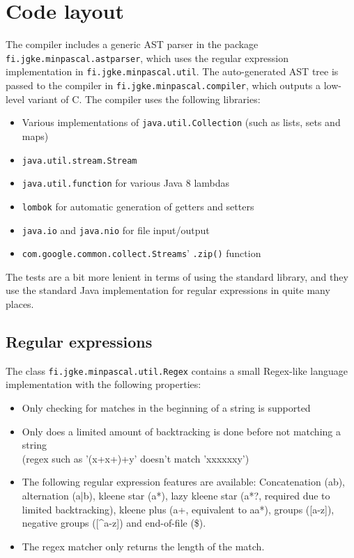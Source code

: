 \documentclass{article}
\begin{document}
\section{Code layout}
The compiler includes a generic AST parser in the package
\texttt{fi.jgke.minpascal.astparser}, which uses the regular expression
implementation in \texttt{fi.jgke.minpascal.util}. The auto-generated AST tree
is passed to the compiler in \texttt{fi.jgke.minpascal.compiler}, which outputs
a low-level variant of C. The compiler uses the following libraries:
\begin{itemize}
    \item Various implementations of \texttt{java.util.Collection} (such as lists, sets and maps)
    \item \texttt{java.util.stream.Stream}
    \item \texttt{java.util.function} for various Java 8 lambdas
    \item \texttt{lombok} for automatic generation of getters and setters
    \item \texttt{java.io} and \texttt{java.nio} for file input/output
    \item \texttt{com.google.common.collect.Streams}' \texttt{.zip()} function
\end{itemize}

The tests are a bit more lenient in terms of using the standard library, and
they use the standard Java implementation for regular expressions in quite many
places.

\subsection{Regular expressions}
The class \texttt{fi.jgke.minpascal.util.Regex} contains a small Regex-like language
implementation with the following properties:
\begin{itemize}
    \item Only checking for matches in the beginning of a string is supported
    \item Only does a limited amount of backtracking is done before not
        matching a string \\
        (regex such as '(x+x+)+y' doesn't match 'xxxxxxy')
    \item The following regular expression features are available:
        Concatenation (ab), alternation (a|b), kleene star (a*), lazy
        kleene star (a*?, required due to limited backtracking), kleene plus
        (a+, equivalent to aa*), groups ([a-z]), negative groups ([\^{}a-z])
        and end-of-file (\$).
    \item The regex matcher only returns the length of the match.
\end{itemize}
\end{document}
